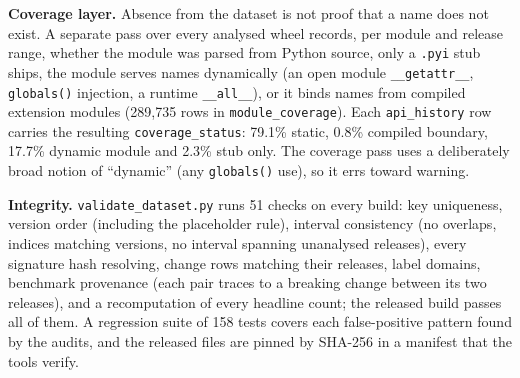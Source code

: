 \documentclass[10pt,twocolumn,letterpaper]{article}
\begin{document}
\textbf{Coverage layer.} Absence from the dataset is not proof that a name does not exist. A separate pass over every
analysed wheel records, per module and release range, whether the module was parsed from Python source, only a
\texttt{.pyi} stub ships, the module serves names dynamically (an open module \texttt{\_\_getattr\_\_},
\texttt{globals()} injection, a runtime \texttt{\_\_all\_\_}), or it binds names from compiled extension modules
(289,735 rows in \texttt{module\_coverage}). Each \texttt{api\_history} row carries the resulting
\texttt{coverage\_status}: 79.1\% static, 0.8\% compiled boundary, 17.7\%
dynamic module and 2.3\% stub only. The coverage pass uses a deliberately broad notion of ``dynamic'' (any
\texttt{globals()} use), so it errs toward warning.

\textbf{Integrity.} \texttt{validate\_dataset.py} runs 51 checks on every build: key uniqueness, version order
(including the placeholder rule), interval consistency (no overlaps, indices matching versions, no interval spanning
unanalysed releases), every signature hash resolving, change rows matching their releases, label domains, benchmark
provenance (each pair traces to a breaking change between its two releases), and a recomputation of every headline
count; the released build passes all of them. A regression suite of 158 tests covers each false-positive pattern
found by the audits, and the released files are pinned by SHA-256 in a manifest that the tools verify.
\end{document}
